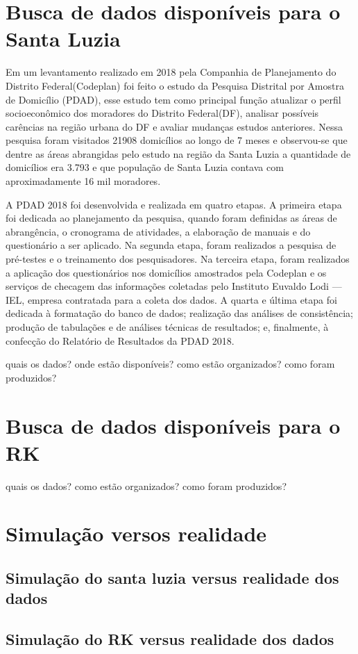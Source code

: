 \section{Busca de dados disponíveis para o Santa Luzia}

Em um levantamento realizado em 2018 pela Companhia de Planejamento do Distrito Federal(Codeplan) foi feito o estudo da Pesquisa Distrital por Amostra de Domicílio (PDAD), esse estudo tem como principal função atualizar o perfil socioeconômico dos moradores do Distrito Federal(DF), analisar possíveis carências na região urbana do DF e avaliar mudanças estudos anteriores. Nessa pesquisa foram visitados 21908 domicílios ao longo de 7 meses e observou-se que dentre as áreas abrangidas pelo estudo na região da Santa Luzia a quantidade de domicílios era 3.793 e que população de Santa Luzia contava com aproximadamente 16 mil moradores.\cite{CODEPLAN:online}

A PDAD 2018 foi desenvolvida e realizada em quatro etapas. A primeira etapa foi dedicada ao
planejamento da pesquisa, quando foram definidas as áreas de abrangência, o cronograma de atividades,
a elaboração de manuais e do questionário a ser aplicado. Na segunda etapa, foram realizados a pesquisa
de pré-testes e o treinamento dos pesquisadores. Na terceira etapa, foram realizados a aplicação dos
questionários nos domicílios amostrados pela Codeplan e os serviços de checagem das informações
coletadas pelo Instituto Euvaldo Lodi — IEL, empresa contratada para a coleta dos dados. A quarta e
última etapa foi dedicada à formatação do banco de dados; realização das análises de consistência;
produção de tabulações e de análises técnicas de resultados; e, finalmente, à confecção do Relatório de
Resultados da PDAD 2018.\cite{CODEPLAN:online}





quais os dados? onde estão disponíveis? como estão organizados?
como foram produzidos?

\section{Busca de dados disponíveis para o RK}

quais os dados? como estão organizados? como foram produzidos?

\section{Simulação versos realidade}

\subsection{Simulação do santa luzia versus realidade dos dados}

\subsection{Simulação do RK versus realidade dos dados}

